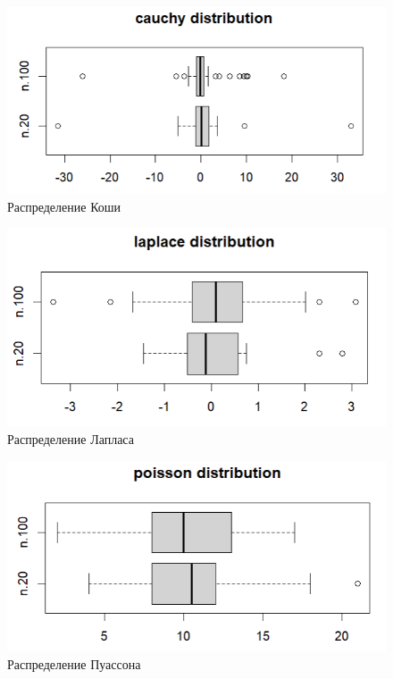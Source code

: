 \documentclass[a4paper,14pt]{article}
\begin{document}
	\begin{figure}[H]
		\centering
		\includegraphics[scale=0.9]{./lab1_3/pictures/boxplot rcauchy.PNG}
		\caption{Распределение Коши}
		\label{fig:cauchy}
	\end{figure}
	
	\begin{figure}[H]
		\centering
		\includegraphics[scale=0.9]{./lab1_3/pictures/boxplot rlaplace.PNG}
		\caption{Распределение Лапласа}
		\label{fig:laplace}
	\end{figure}
	
	\begin{figure}[H]
		\centering
		\includegraphics[scale=0.9]{./lab1_3/pictures/boxplot rpois.PNG}
		\caption{Распределение Пуассона}
		\label{fig:poisson}
	\end{figure}
	
\end{document}
